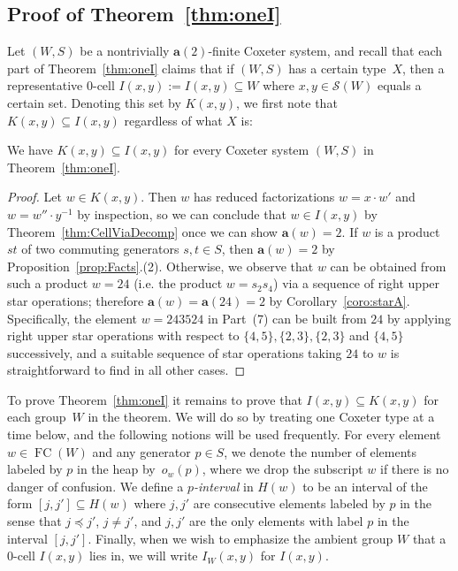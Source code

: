 \documentclass[ALCO,Unicode,published]{cedram}
\newcommand{\la}{\mathbf{a}}
\newcommand{\sw}{\mathcal{S}(W)}
\newcommand{\ntatf}{nontrivially $\la(2)$-finite }
\newcommand{\se}{\subseteq}
\newcommand{\inverse}{^{-1}}
\DeclareMathOperator{\fc}{\mathrm{FC}}
\begin{document}
\subsection{Proof of \texorpdfstring{Theorem~\ref{thm:oneI}}{Theorem 4.17}}
\label{sec:proofs}
Let $(W,S)$ be a \ntatf Coxeter system, and recall that each part of Theorem~\ref{thm:oneI} claims that if
$(W,S)$ has a certain type~$X$, then a representative 0-cell $I(x,y):=I(x,y)\se W$ where $x,y\in
\sw$ equals a certain set. Denoting this set by $K(x,y)$, we first note that $K(x,y)\se I(x,y)$
regardless of what $X$ is:

\begin{prop}
We have $K(x,y)\se I(x,y)$ for every Coxeter system $(W,S)$ in Theorem~\ref{thm:oneI}.  
\end{prop}
\begin{proof} Let $w\in K(x,y)$. Then $w$ has reduced factorizations $w=x\cdot w'$ and $w=w''\cdot
      y\inverse$ by inspection, so we can conclude that $w\in I(x,y)$ by Theorem~\ref{thm:CellViaDecomp}
      once we can show $\la(w)=2$.  If $w$ is a product $st$ of two commuting generators $s,t\in S$,
      then $\la(w)=2$ by Proposition~\ref{prop:Facts}.(2). Otherwise, we observe that $w$ can be obtained from
      such a product $w=24$ (i.e. the product $w=s_2s_4$) via a sequence of right upper star
      operations; therefore $\la(w)=\la(24)=2$ by Corollary~\ref{coro:starA}.  Specifically, the element
      $w=243524$ in Part~(7) can be built from $24$ by applying right upper star operations with
      respect to $\{4,5\}, \{2,3\}, \{2,3\}$ and $\{4,5\}$ successively, and a suitable sequence of
      star operations taking $24$ to $w$ is straightforward to find in all other cases. 
\end{proof}

To prove Theorem~\ref{thm:oneI} it remains to prove that $I(x,y)\se K(x,y)$ for each group~$W$ in the
theorem. We will do so by treating one Coxeter type at a time below, and the following notions will
be used frequently. For every element $w\in \fc(W)$ and any generator $p\in S$, we denote the number
of elements labeled by $p$ in the heap by~$o_w(p)$, where we drop the subscript $w$ if there is no
danger of confusion. We define a \emph{$p$-interval} in $H(w)$ to be an interval of the form
$[j,j']\se H(w)$ where $j,j'$ are consecutive elements labeled by $p$ in the sense that $j\preceq
j'$, $j\neq j'$, and $j,j'$ are the only elements with label $p$ in the interval $[j,j']$.  Finally,
when we wish to emphasize the ambient group $W$ that a 0-cell $I(x,y)$ lies in, we will write
$I_{W}(x,y)$ for $I(x,y)$. 
\end{document}
